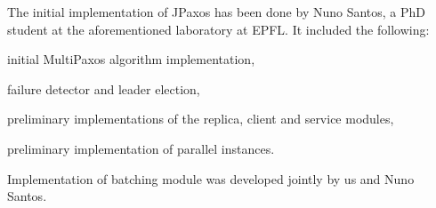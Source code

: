 
\noindent The initial implementation of JPaxos has been done by Nuno Santos, a PhD student at the aforementioned laboratory at EPFL. It included the following:

\begin{tightList}
  \item[\textbullet] initial MultiPaxos algorithm implementation,
  \item[\textbullet] failure detector and leader election,
  \item[\textbullet] preliminary implementations of the replica, client and service modules,
  \item[\textbullet] preliminary implementation of parallel instances.
\end{tightList}

\noindent Implementation of batching module was developed jointly by us and Nuno Santos.


